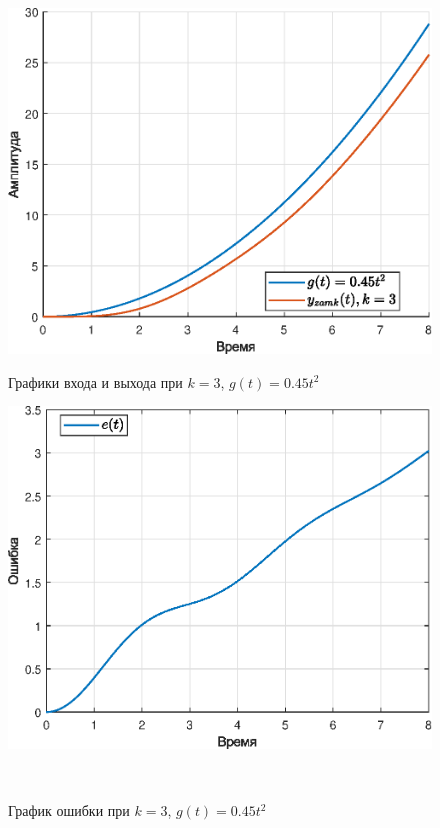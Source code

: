 \documentclass[a4paper]{article}
\begin{document}
\begin{figure}[H]
    \begin{minipage}{0.5\textwidth}
        \centering \includegraphics[width=\textwidth]{ex4/k3_g_at2.eps}
        \caption{Графики входа и выхода при $k=3$, $g(t)=0.45t^2$}
    \end{minipage}\hfill
    \begin{minipage}{0.5\textwidth}
        \centering \includegraphics[width=\textwidth]{ex4/k3_g_at2_error.eps}
        \caption{График ошибки при $k=3$, $g(t)=0.45t^2$}
    \end{minipage}\\[1em]
\end{figure}\noindent\
\end{document}
